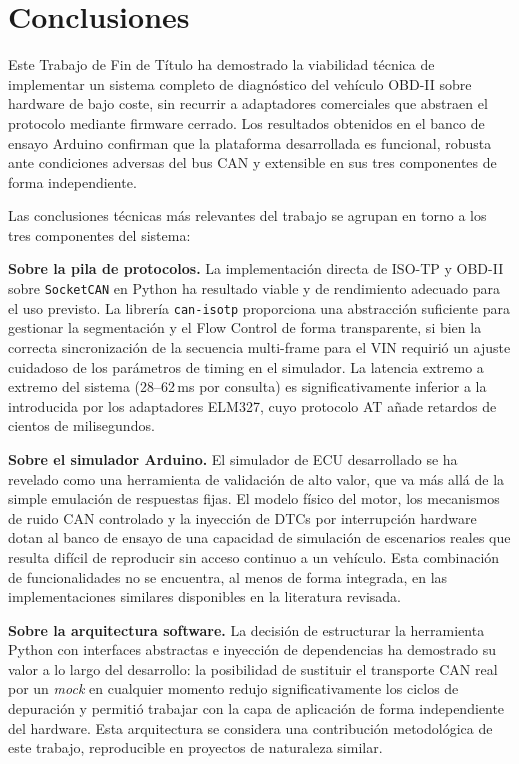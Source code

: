 \section{Conclusiones}
\label{sec:conclusiones}

Este Trabajo de Fin de Título ha demostrado la viabilidad técnica de implementar un sistema completo de diagnóstico del vehículo OBD-II sobre hardware de bajo coste, sin recurrir a adaptadores comerciales que abstraen el protocolo mediante firmware cerrado. Los resultados obtenidos en el banco de ensayo Arduino confirman que la plataforma desarrollada es funcional, robusta ante condiciones adversas del bus CAN y extensible en sus tres componentes de forma independiente.

Las conclusiones técnicas más relevantes del trabajo se agrupan en torno a los tres componentes del sistema:

\textbf{Sobre la pila de protocolos.} La implementación directa de ISO-TP y OBD-II sobre \texttt{SocketCAN} en Python ha resultado viable y de rendimiento adecuado para el uso previsto. La librería \texttt{can-isotp} proporciona una abstracción suficiente para gestionar la segmentación y el Flow Control de forma transparente, si bien la correcta sincronización de la secuencia multi-frame para el VIN requirió un ajuste cuidadoso de los parámetros de timing en el simulador. La latencia extremo a extremo del sistema (28--62\,ms por consulta) es significativamente inferior a la introducida por los adaptadores ELM327, cuyo protocolo AT añade retardos de cientos de milisegundos.

\textbf{Sobre el simulador Arduino.} El simulador de ECU desarrollado se ha revelado como una herramienta de validación de alto valor, que va más allá de la simple emulación de respuestas fijas. El modelo físico del motor, los mecanismos de ruido CAN controlado y la inyección de DTCs por interrupción hardware dotan al banco de ensayo de una capacidad de simulación de escenarios reales que resulta difícil de reproducir sin acceso continuo a un vehículo. Esta combinación de funcionalidades no se encuentra, al menos de forma integrada, en las implementaciones similares disponibles en la literatura revisada.

\textbf{Sobre la arquitectura software.} La decisión de estructurar la herramienta Python con interfaces abstractas e inyección de dependencias ha demostrado su valor a lo largo del desarrollo: la posibilidad de sustituir el transporte CAN real por un \textit{mock} en cualquier momento redujo significativamente los ciclos de depuración y permitió trabajar con la capa de aplicación de forma independiente del hardware. Esta arquitectura se considera una contribución metodológica de este trabajo, reproducible en proyectos de naturaleza similar.

